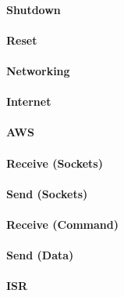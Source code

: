\paragraph{Shutdown}
\paragraph{Reset}
\paragraph{Networking}
\paragraph{Internet}
\paragraph{AWS}
\paragraph{Receive (Sockets)}
\paragraph{Send (Sockets)}
\paragraph{Receive (Command)}
\paragraph{Send (Data)}
\paragraph{ISR}
